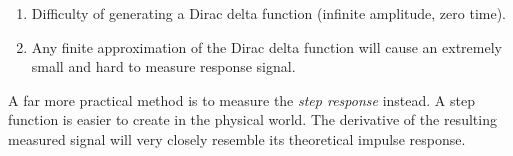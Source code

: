 \begin{enumerate}
    \item Difficulty of generating a Dirac delta function (infinite amplitude, zero time).
    \item Any finite approximation of the Dirac delta function will cause an extremely small and hard to measure response signal.
\end{enumerate}

A far more practical method is to measure the  \textit{step response} instead. A
step function is easier to create in the physical world.  The  derivative of the
resulting measured signal will  very  closely  resemble  its theoretical impulse
response.






